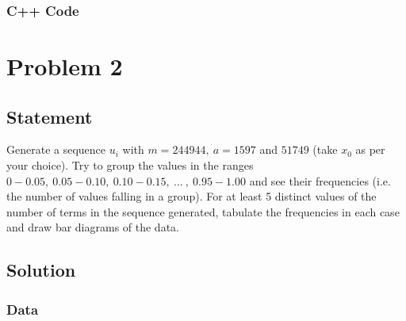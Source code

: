 \documentclass[10pt]{article}
\begin{document}
\subsubsection{C++ Code}



\pagebreak

\section{Problem 2}

\subsection{Statement}

Generate a sequence $u_i$ with $m = 244944,\: a = 1597$ and $51749$ (take $x_0$ as per your choice). Try to group the values in the ranges $0 - 0.05,\: 0.05 - 0.10,\: 0.10 - 0.15,\: \ldots\:,\: 0.95-1.00$ and see their frequencies (i.e. the number of values falling in a group). For at least 5 distinct values of the number of terms in the sequence generated, tabulate the frequencies in each case and draw bar diagrams of the data.

\subsection{Solution}

\subsubsection{Data}
\end{document}

